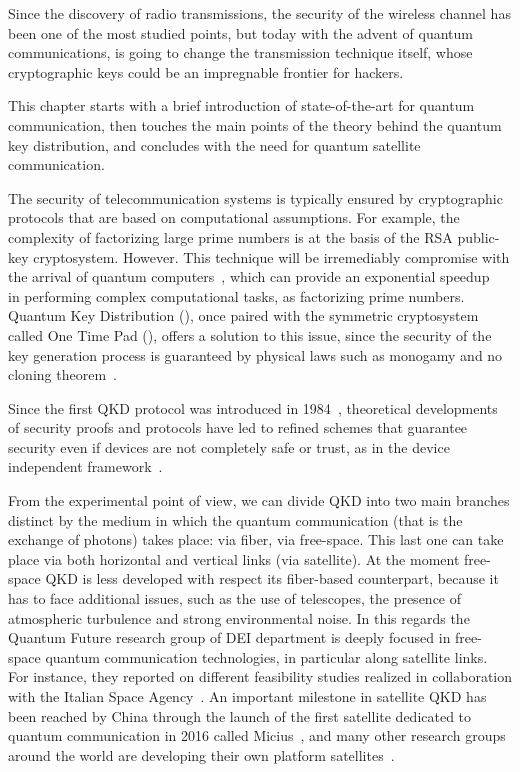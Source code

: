 
Since the discovery of radio transmissions, the security of the wireless channel has been one of the most studied points, but today with the advent of quantum communications, is going to change the transmission technique itself, whose cryptographic keys could be an impregnable frontier for hackers.

This chapter starts with a brief introduction of state-of-the-art for quantum communication, then touches the main points of the theory behind the quantum key distribution, and concludes with the need for quantum satellite communication.


The security of telecommunication systems is typically ensured by cryptographic protocols that are based on computational assumptions. For example, the complexity of factorizing large prime numbers is at the basis of the RSA public-key cryptosystem. However. This technique will be irremediably compromise with the arrival of quantum computers~\cite{a1,a2,a3}, which can provide an exponential speedup~\cite{a4} in performing complex computational tasks, as factorizing prime numbers. Quantum Key Distribution (), once paired with the symmetric cryptosystem called One Time Pad (), offers a solution to this issue, since the security of the key generation process is guaranteed by physical laws such as monogamy and no cloning theorem~\cite{a5}.

Since the first QKD protocol was introduced in 1984~\cite{a6}, theoretical developments of security proofs and protocols have led to refined schemes that guarantee security even if devices are not completely safe or trust, as in the device independent framework~\cite{a5,a6,a7,a8,a9,a10,a11}.

From the experimental point of view, we can divide QKD into two main branches distinct by the medium in which the quantum communication (that is the exchange of photons) takes place: via fiber, via free-space. This last one can take place via both horizontal and vertical links (via satellite). At the moment free-space QKD is less developed with respect its fiber-based counterpart, because it has to face additional issues, such as the use of telescopes, the presence of atmospheric turbulence and strong environmental noise. In this regards the Quantum Future research group of DEI department is deeply focused in free-space quantum communication technologies, in particular along satellite links. For instance, they reported on different feasibility studies realized in collaboration with the Italian Space Agency~\cite{a12,a13,a14}. An important milestone in satellite QKD has been reached by China through the launch of the first satellite dedicated to quantum communication in 2016 called Micius~\cite{a15}, and many other research groups around the world are developing their own platform satellites~\cite{a16,a17,a18}.

